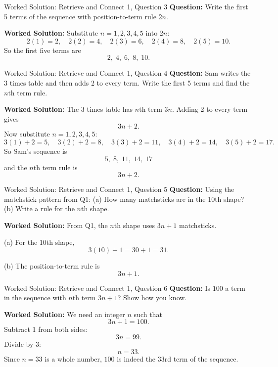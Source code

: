 \documentclass{beamer}
\begin{document}
\begin{frame}{Worked Solution: Retrieve and Connect 1, Question 3}
\textbf{Question:} Write the first 5 terms of the sequence with position-to-term rule $2n$.

\textbf{Worked Solution:} Substitute $n=1,2,3,4,5$ into $2n$:
\[
2(1)=2,\quad 2(2)=4,\quad 2(3)=6,\quad 2(4)=8,\quad 2(5)=10.
\]
So the first five terms are
\[
2,\;4,\;6,\;8,\;10.
\]
\end{frame}

\begin{frame}{Worked Solution: Retrieve and Connect 1, Question 4}
\textbf{Question:} Sam writes the 3 times table and then adds 2 to every term. Write the first 5 terms and find the $n$th term rule.

\textbf{Worked Solution:} The 3 times table has $n$th term $3n$. Adding 2 to every term gives
\[
3n+2.
\]
Now substitute $n=1,2,3,4,5$:
\[
3(1)+2=5,\quad 3(2)+2=8,\quad 3(3)+2=11,\quad 3(4)+2=14,\quad 3(5)+2=17.
\]
So Sam's sequence is
\[
5,\;8,\;11,\;14,\;17
\]
and the $n$th term rule is
\[
3n+2.
\]
\end{frame}

\begin{frame}{Worked Solution: Retrieve and Connect 1, Question 5}
\textbf{Question:} Using the matchstick pattern from Q1: (a) How many matchsticks are in the 10th shape? (b) Write a rule for the $n$th shape.

\textbf{Worked Solution:} From Q1, the $n$th shape uses $3n+1$ matchsticks.

(a) For the 10th shape,
\[
3(10)+1=30+1=31.
\]

(b) The position-to-term rule is
\[
3n+1.
\]
\end{frame}

\begin{frame}{Worked Solution: Retrieve and Connect 1, Question 6}
\textbf{Question:} Is $100$ a term in the sequence with $n$th term $3n+1$? Show how you know.

\textbf{Worked Solution:} We need an integer $n$ such that
\[
3n+1=100.
\]
Subtract 1 from both sides:
\[
3n=99.
\]
Divide by 3:
\[
n=33.
\]
Since $n=33$ is a whole number, $100$ is indeed the 33rd term of the sequence.
\end{frame}
\end{document}
